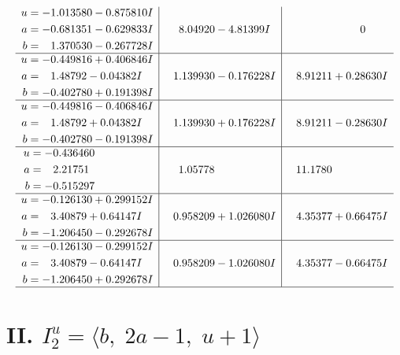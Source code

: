 \documentclass[1p]{elsarticle_modified}
\theoremstyle{definition}
\begin{document}
$$\begin{array}{c|c|c}
\begin{aligned}
u &= -1.013580 - 0.875810 I \\
a &= -0.681351 - 0.629833 I \\
b &= \phantom{-}1.370530 - 0.267728 I\end{aligned}
 & \phantom{-}8.04920 - 4.81399 I & \phantom{-0.000000 } 0 \\ \hline\begin{aligned}
u &= -0.449816 + 0.406846 I \\
a &= \phantom{-}1.48792 - 0.04382 I \\
b &= -0.402780 + 0.191398 I\end{aligned}
 & \phantom{-}1.139930 - 0.176228 I & \phantom{-}8.91211 + 0.28630 I \\ \hline\begin{aligned}
u &= -0.449816 - 0.406846 I \\
a &= \phantom{-}1.48792 + 0.04382 I \\
b &= -0.402780 - 0.191398 I\end{aligned}
 & \phantom{-}1.139930 + 0.176228 I & \phantom{-}8.91211 - 0.28630 I \\ \hline\begin{aligned}
u &= -0.436460\phantom{ +0.000000I} \\
a &= \phantom{-}2.21751\phantom{ +0.000000I} \\
b &= -0.515297\phantom{ +0.000000I}\end{aligned}
 & \phantom{-}1.05778\phantom{ +0.000000I} & \phantom{-}11.1780\phantom{ +0.000000I} \\ \hline\begin{aligned}
u &= -0.126130 + 0.299152 I \\
a &= \phantom{-}3.40879 + 0.64147 I \\
b &= -1.206450 - 0.292678 I\end{aligned}
 & \phantom{-}0.958209 + 1.026080 I & \phantom{-}4.35377 + 0.66475 I \\ \hline\begin{aligned}
u &= -0.126130 - 0.299152 I \\
a &= \phantom{-}3.40879 - 0.64147 I \\
b &= -1.206450 + 0.292678 I\end{aligned}
 & \phantom{-}0.958209 - 1.026080 I & \phantom{-}4.35377 - 0.66475 I\\
 \hline 
 \end{array}$$\newpage\newpage\renewcommand{\arraystretch}{1}
\centering \section*{II. $I^u_{2}= \langle b,\;2 a-1,\;u+1 \rangle$}
\end{document}
